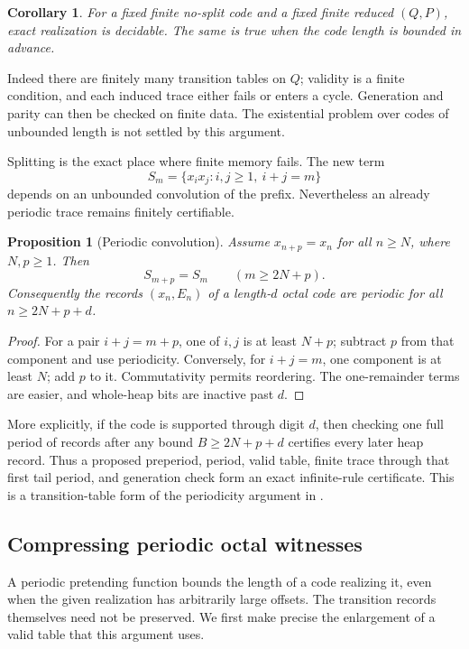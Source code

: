 \documentclass[11pt]{article}
\newtheorem{proposition}[theorem]{Proposition}
\newtheorem{corollary}[theorem]{Corollary}
\theoremstyle{definition}
\theoremstyle{remark}
\begin{document}
\begin{corollary}\label{cor:decidable}
For a fixed finite no-split code and a fixed finite reduced $(Q,P)$, exact
realization is decidable.  The same is true when the code length is bounded
in advance.
\end{corollary}

Indeed there are finitely many transition tables on $Q$; validity is a
finite condition, and each induced trace either fails or enters a cycle.
Generation and parity can then be checked on finite data.  The existential
problem over codes of unbounded length is not settled by this argument.

Splitting is the exact place where finite memory fails.  The new term
\[
 S_m=\{x_i x_j:i,j\ge1,\ i+j=m\}
\]
depends on an unbounded convolution of the prefix.  Nevertheless an already
periodic trace remains finitely certifiable.

\begin{proposition}[Periodic convolution]\label{prop:convolution}
Assume $x_{n+p}=x_n$ for all $n\ge N$, where $N,p\ge1$.  Then
\[
 S_{m+p}=S_m\qquad(m\ge2N+p).
\]
Consequently the records $(x_n,E_n)$ of a length-$d$ octal code are
periodic for all $n\ge2N+p+d$.
\end{proposition}

\begin{proof}
For a pair $i+j=m+p$, one of $i,j$ is at least $N+p$; subtract $p$ from
that component and use periodicity.  Conversely, for $i+j=m$, one component
is at least $N$; add $p$ to it.  Commutativity permits reordering.  The
one-remainder terms are easier, and whole-heap bits are inactive past $d$.
\end{proof}

More explicitly, if the code is supported through digit $d$, then checking
one full period of records after any bound $B\ge2N+p+d$ certifies every later
heap record.  Thus a proposed preperiod, period, valid table, finite trace
through that first tail period, and generation check form an exact
infinite-rule certificate.  This is a transition-table form of the
periodicity argument in \cite{siegel2006notes,plambecksiegel2008}.

\subsection{Compressing periodic octal witnesses}

A periodic pretending function bounds the length of a code realizing it,
even when the given realization has arbitrarily large offsets.  The
transition records themselves need not be preserved.  We first make precise
the enlargement of a valid table that this argument uses.
\end{document}
